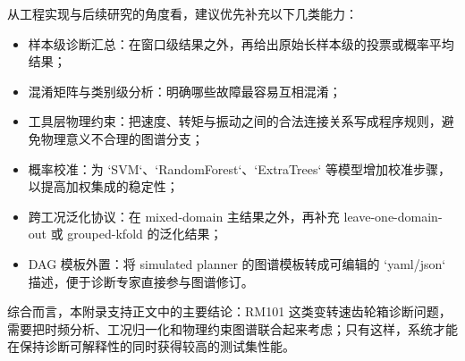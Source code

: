 从工程实现与后续研究的角度看，建议优先补充以下几类能力：

\begin{itemize}
    \item 样本级诊断汇总：在窗口级结果之外，再给出原始长样本级的投票或概率平均结果；
    \item 混淆矩阵与类别级分析：明确哪些故障最容易互相混淆；
    \item 工具层物理约束：把速度、转矩与振动之间的合法连接关系写成程序规则，避免物理意义不合理的图谱分支；
    \item 概率校准：为 `SVM`、`RandomForest`、`ExtraTrees` 等模型增加校准步骤，以提高加权集成的稳定性；
    \item 跨工况泛化协议：在 mixed-domain 主结果之外，再补充 leave-one-domain-out 或 grouped-kfold 的泛化结果；
    \item DAG 模板外置：将 simulated planner 的图谱模板转成可编辑的 `yaml/json` 描述，便于诊断专家直接参与图谱修订。
\end{itemize}

综合而言，本附录支持正文中的主要结论：RM101 这类变转速齿轮箱诊断问题，需要把时频分析、工况归一化和物理约束图谱联合起来考虑；只有这样，系统才能在保持诊断可解释性的同时获得较高的测试集性能。
